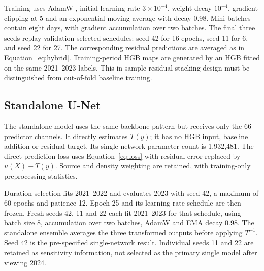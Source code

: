 \documentclass[11pt,a4paper]{article}
\newcommand{\inv}{T^{-1}}
\begin{document}
Training uses AdamW \citep{loshchilov2017}, initial learning rate
$3\times10^{-4}$, weight decay $10^{-4}$, gradient clipping at 5 and an
exponential moving average with decay 0.98. Mini-batches contain eight days,
with gradient accumulation over two batches. The final three seeds replay
validation-selected schedules: seed 42 for 16 epochs, seed 11 for 6, and seed
22 for 27. The corresponding residual predictions are averaged as in
Equation~\ref{eq:hybrid}. Training-period HGB maps are generated by an HGB
fitted on the same 2021--2023 labels. This in-sample residual-stacking design
must be distinguished from out-of-fold baseline training.

\subsection{Standalone U-Net}
The standalone model uses the same backbone pattern but receives only the
66 predictor channels. It directly estimates $T(y)$; it has no HGB input,
baseline addition or residual target. Its single-network parameter count is
1,932,481. The direct-prediction loss uses Equation~\ref{eq:loss} with
residual error replaced by $u(X)-T(y)$. Source and density weighting are
retained, with training-only preprocessing statistics.

Duration selection fits 2021--2022 and evaluates 2023 with seed 42, a maximum
of 60 epochs and patience 12. Epoch 25 and its learning-rate schedule are then
frozen. Fresh seeds 42, 11 and 22 each fit 2021--2023 for that schedule, using
batch size 8, accumulation over two batches, AdamW and EMA decay 0.98. The
standalone ensemble averages the three transformed outputs before applying
$\inv$. Seed 42 is the pre-specified single-network result. Individual seeds
11 and 22 are retained as sensitivity information, not selected as the primary
single model after viewing 2024.
\end{document}
